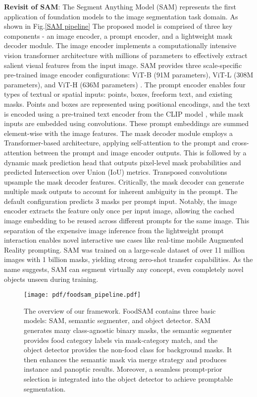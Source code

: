 \documentclass[lettersize,journal]{IEEEtran}
\begin{document}
\textbf{Revisit of SAM}: 
The Segment Anything Model (SAM) \cite{kirillov2023segment} represents the first application of foundation models to the image segmentation task domain. 
As shown in Fig.\ref{SAM pipeline} The proposed model is comprised of three key components - an image encoder, a prompt encoder, and a lightweight mask decoder module. 
The image encoder implements a computationally intensive vision transformer architecture with millions of parameters to effectively extract salient visual features from the input image. 
SAM provides three scale-specific pre-trained image encoder configurations: ViT-B (91M parameters), ViT-L (308M parameters), and ViT-H (636M parameters) \cite{dosovitskiy2020image,he2022masked}. 
The prompt encoder enables four types of textual or spatial inputs: points, boxes, freeform text, and existing masks. 
Points and boxes are represented using positional encodings\cite{vaswani2017attention}, and the text is encoded using a pre-trained text encoder from the CLIP model \cite{radford2021learning}, while mask inputs are embedded using convolutions. 
These prompt embeddings are summed element-wise with the image features. 
The mask decoder module employs a Transformer-based architecture, applying self-attention to the prompt and cross-attention between the prompt and image encoder outputs. 
This is followed by a dynamic mask prediction head that outputs pixel-level mask probabilities and predicted Intersection over Union (IoU) metrics. 
Transposed convolutions upsample the mask decoder features. 
Critically, the mask decoder can generate multiple mask outputs to account for inherent ambiguity in the prompt. 
The default configuration predicts 3 masks per prompt input. 
Notably, the image encoder extracts the feature only once per input image, allowing the cached image embedding to be reused across different prompts for the same image. 
This separation of the expensive image inference from the lightweight prompt interaction enables novel interactive use cases like real-time mobile Augmented Reality prompting. 
SAM was trained on a large-scale dataset of over 11 million images with 1 billion masks, yielding strong zero-shot transfer capabilities. 
As the name suggests, SAM can segment virtually any concept, even completely novel objects unseen during training.

\begin{figure*}[tbh]
\centering
\newpage
\texttt{[image: pdf/foodsam\_pipeline.pdf]}
\caption{The overview of our framework. FoodSAM contains three basic models: SAM, semantic segmenter, and object detector. SAM generates many class-agnostic binary masks, the semantic segmenter provides food category labels via mask-category match, and the object detector provides the non-food class for background masks. It then enhances the semantic mask via merge strategy and produces instance and panoptic results. Moreover, a seamless prompt-prior selection is integrated into the object detector to achieve promptable segmentation.}
\label{fig: foodsam}
\end{figure*}
\end{document}
